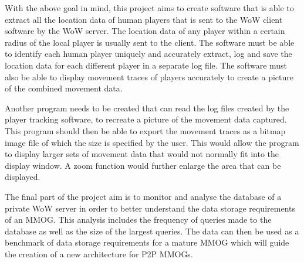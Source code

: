 With the above goal in mind, this project aims to create software that is able to extract all the location data of human players that is sent to the WoW client software by the WoW server. The location data of any player within  a certain radius of the local player is usually sent to the client. The software must be able to identify each human player uniquely and accurately extract, log and save the location data for each different player in a separate log file. The software must also be able to display movement traces of players accurately to create a  picture of the combined movement data.

Another program needs to be created that can read the log files created by the player tracking software, to recreate a picture of the movement data captured. This program should then be able to export the movement traces as a bitmap image file of which the size is specified by the user. This would allow the program to display larger sets of movement data that would not normally fit into the display window. A zoom function would further enlarge the area that can be displayed. 

The final part of the project aim is to monitor and analyse the database of a private WoW server in order to better understand the data storage requirements of an MMOG. This analysis includes the frequency of queries made to the database as well as the size of the largest queries. %
The data can then be used as a benchmark of data storage requirements for a mature MMOG which will guide the creation of a new architecture for P2P MMOGs.



